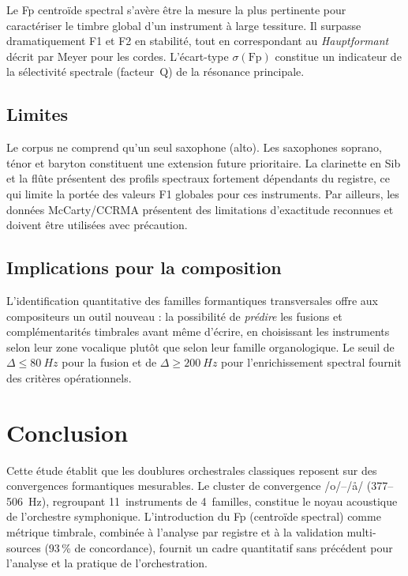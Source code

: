 \documentclass[11pt,a4paper]{article}
\begin{document}
Le Fp centroïde spectral s'avère être la mesure la plus pertinente pour
caractériser le timbre global d'un instrument à large tessiture. Il
surpasse dramatiquement F1 et F2 en stabilité, tout en correspondant au
\emph{Hauptformant} décrit par Meyer pour les cordes. L'écart-type
$\sigma(\mathrm{Fp})$ constitue un indicateur de la sélectivité
spectrale (facteur~Q) de la résonance principale.

\subsection{Limites}

Le corpus ne comprend qu'un seul saxophone (alto). Les saxophones
soprano, ténor et baryton constituent une extension future prioritaire.
La clarinette en Sib et la flûte présentent des profils spectraux
fortement dépendants du registre, ce qui limite la portée des valeurs
F1 globales pour ces instruments. Par ailleurs, les données McCarty/CCRMA
présentent des limitations d'exactitude reconnues et doivent être
utilisées avec précaution.

\subsection{Implications pour la composition}

L'identification quantitative des familles formantiques transversales
offre aux compositeurs un outil nouveau : la possibilité de
\emph{prédire} les fusions et complémentarités timbrales avant même
d'écrire, en choisissant les instruments selon leur zone vocalique
plutôt que selon leur famille organologique. Le seuil de $\Delta \leq
\SI{80}{Hz}$ pour la fusion et de $\Delta \geq \SI{200}{Hz}$ pour
l'enrichissement spectral fournit des critères opérationnels.


\section{Conclusion}

Cette étude établit que les doublures orchestrales classiques reposent
sur des convergences formantiques mesurables. Le cluster de convergence
/o/--/\r{a}/ (377--\SI{506}{Hz}), regroupant 11~instruments de
4~familles, constitue le noyau acoustique de l'orchestre symphonique.
L'introduction du Fp (centroïde spectral) comme métrique timbrale,
combinée à l'analyse par registre et à la validation multi-sources
(93\,\% de concordance), fournit un cadre quantitatif sans précédent
pour l'analyse et la pratique de l'orchestration.
\end{document}
